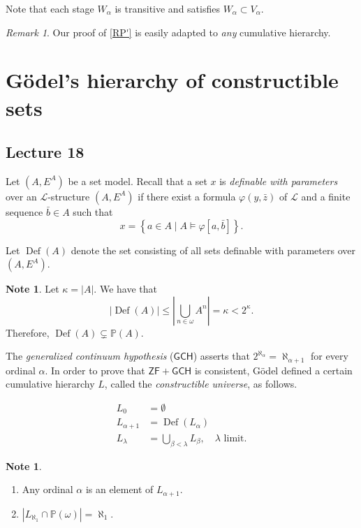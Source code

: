 \documentclass[10pt,letterpaper,cm]{nupset}
\theoremstyle{definition}
\newtheorem{note}[definition]{Note}
\theoremstyle{theorem}
\theoremstyle{remark}
\newtheorem{remark}[definition]{Remark}
\renewcommand{\L}{\mathcal L}
\renewcommand{\P}{\mathbb P}
\newcommand{\1}{\mathbf{1}}
\newcommand{\0}{\vec 0}
\newcommand{\zf}{\mathsf{ZF}}
\DeclareMathOperator{\Def}{Def}
\newcommand{\be}{\begin{enumerate}}
\newcommand{\ee}{\end{enumerate}}
\begin{document}
Note that each stage $W_{\alpha}$ is transitive and satisfies $W_{\alpha}\subset V_{\alpha}$.

\begin{remark}
Our proof of \cref{RP'} is easily adapted to \emph{any} cumulative hierarchy.
\end{remark}

\section{G\"odel's hierarchy of constructible sets}

\subsection{Lecture 18}

Let $\left(A, E^A\right)$ be a set model. Recall that a set $x$ is \textit{definable with parameters} over an $\L$-structure $\left(A, E^A\right)$ if there exist a formula $\varphi(y, \bar{z})$ of $\L$ and a finite sequence $\bar{b}\in A$ such that 
\[
x = \left\{a\in A \mid A \models \varphi\left[a, \bar{b}\right]\right\}.
\]

Let $\Def(A)$ denote the set consisting of all sets definable with parameters over $\left(A, E^A\right)$.

\begin{note}
Let $\kappa = \left\lvert{A}\right\rvert$. We have that $$\left\lvert{\Def(A)}\right\rvert \leq \left\lvert{\bigcup_{n\in \omega}A^n}\right\rvert = \kappa <2^{\kappa}.$$ Therefore, $\Def(A) \subsetneq \P(A)$.
\end{note}

\smallskip

The \textit{generalized continuum hypothesis} ($\mathsf{GCH}$) asserts that $2^{\aleph_{\alpha}} = \aleph_{\alpha+1}$ for every ordinal $\alpha$. In order to prove that $\zf + \mathsf{GCH}$ is consistent, G\"odel defined a certain cumulative hierarchy $L$, called the \textit{constructible universe}, as follows.

\begin{align*}
L_0 & = \emptyset 
\\ L_{\alpha +1}& =  \Def(L_{\alpha})
\\  L_{\lambda} & = \bigcup_{\beta < \lambda }L_{\beta},\quad  \lambda \text{ limit}.
\end{align*}

\begin{note} $ $
\be
\item Any ordinal $\alpha$ is an element of $L_{\alpha+1}$.
\item $\left\lvert{L_{\aleph_1} \cap \P(\omega)}\right\rvert =\aleph_1$.
\ee
\end{note}
\end{document}
